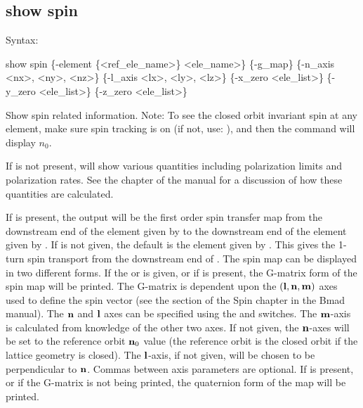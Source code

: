 {{{{{{{{{%

\subsection{show spin}
\label{s:show.spin}

Syntax:
\begin{example}
  show spin \{-element \{<ref_ele_name>\} <ele_name>\} \{-g_map\}
                  \{-n_axis <nx>, <ny>, <nz>\} \{-l_axis <lx>, <ly>, <lz>\}
                  \{-x_zero <ele_list>\} \{-y_zero <ele_list>\} \{-z_zero <ele_list>\}
\end{example}

Show spin related information.  Note: To see the closed orbit invariant spin at any element, make
sure spin tracking is on (if not, use: ), and then the
 command will display $n_0$.

If  is not present,  will show various quantities including polarization
limits and polarization rates. See the  chapter of the \bmad manual for a
discussion of how these quantities are calculated.

If  is present, the output will be the first order spin transfer map from the
downstream end of the element given by  to the downstream end of the element
given by .  If  is not given, the default is the element
given by . This gives the 1-turn spin transport from the downstream end of
. The spin map can be displayed in two different forms. If the 
or  is given, or if  is present, the G-matrix form of the spin map will be
printed.  The G-matrix is dependent upon the $({\bf l}, {\bf n}, {\bf m})$ axes used to define the spin
vector (see the  section of the Spin chapter in the Bmad manual). The ${\bf n}$ and
${\bf l}$ axes can be specified using the  and  switches. The ${\bf m}$-axis is
calculated from knowledge of the other two axes. If not given, the ${\bf n}$-axes will be set to the
reference orbit ${\bf n}_0$ value (the reference orbit is the closed orbit if the lattice geometry is
closed).  The ${\bf l}$-axis, if not given, will be chosen to be perpendicular to ${\bf n}$. Commas
between axis parameters are optional. If  is present, or if the G-matrix is not being
printed, the quaternion form of the map will be printed.

}}}}}}}}}
